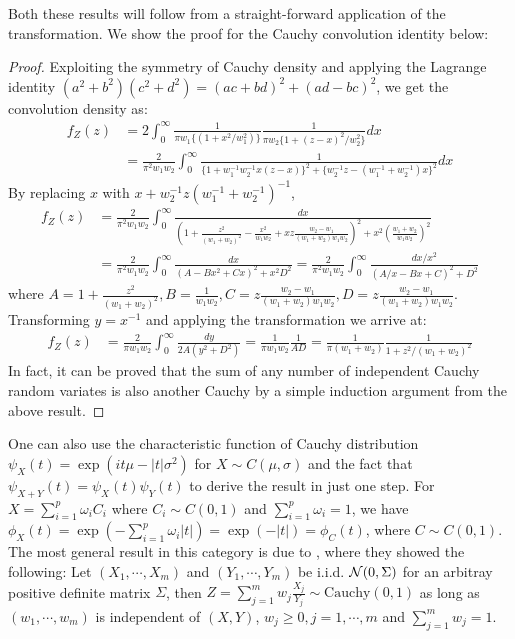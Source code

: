 \documentclass[letterpaper,11pt]{article}
\begin{document}
\noindent Both these results will follow from a straight-forward application of the \CS transformation. We show the proof for the Cauchy convolution identity below:
\begin{proof}
Exploiting the symmetry of Cauchy density and applying the Lagrange identity $(a^2 + b^2)(c^2 + d^2) = (ac+bd)^2 + (ad-bc)^2$, we get the convolution density as: 
\begin{align*} 
f_Z(z) & = 2 \int_{0}^{\infty} \frac{1}{ \pi w_1 \{ (1+ x^2/w_1^2) \} } \frac{1}{\pi w_2 \{1+ (z-x)^2/w_2^2 \} } dx \\
& = \frac{2}{\pi^2 w_1 w_2} \int_{0}^{\infty} \frac{1}{ \{1+ w_1^{-1} w_2^{-1} x (z-x) \}^2 + \{w_2^{-1}z - (w_1^{-1}+ w_2^{-1}) x \}^2 } dx
\end{align*}
By replacing $x$ with $x + w_2^{-1}z (w_1^{-1} + w_2^{-1})^{-1}$, 
\begin{align*}
f_Z(z) & = \frac{2}{\pi^2 w_1 w_2} \int_{0}^{\infty} \frac{dx}{ \left( 1 + \frac{z^2}{(w_1+w_2)^2} - \frac{x^2}{w_1w_2} + xz \frac{w_2-w_1}{(w_1+w_2) w_1 w_2} \right)^2 + x^2 (\frac{w_1 + w_2}{w_1w_2})^2} \\
& = \frac{2}{\pi^2 w_1 w_2} \int_{0}^{\infty} \frac{dx}{ \left( A - B x^2 + Cx \right)^2 + x^2 D^2 } = \frac{2}{\pi^2 w_1 w_2} \int_{0}^{\infty} \frac{dx/x^2}{ \left( A/x - B x + C \right)^2 + D^2 } 
\end{align*}
where $A = 1 + \frac{z^2}{(w_1+w_2)^2}, B = \frac{1}{w_1w_2}, C = z \frac{w_2-w_1}{(w_1+w_2) w_1 w_2}, D = z \frac{w_2-w_1}{(w_1+w_2) w_1 w_2}$. Transforming $y = x^{-1}$ and applying the \CS transformation we arrive at: 
\begin{align*}
f_Z(z) & = \frac{2}{\pi w_1 w_2} \int_{0}^{\infty} \frac{dy}{2A (y^2 + D^2)} = \frac{1}{\pi w_1 w_2} \frac{1}{A D} = \frac{1}{\pi (w_1+w_2)} \frac{1}{1+ z^2/(w_1+w_2)^2}
\end{align*}
In fact, it can be proved that the sum of any number of independent Cauchy random variates is also another Cauchy by a simple induction argument from the above result. 
\end{proof}
One can also use the characteristic function of Cauchy distribution $\psi_X(t) = \exp(it \mu - |t| \sigma^2)$ for $X \sim C(\mu, \sigma)$ and the fact that $\psi_{X+Y}(t) = \psi_X(t) \psi_Y(t)$ to derive the result in just one step. For $X = \sum_{i=1}^{p} \omega_i C_i$ where $C_i \sim C(0,1)$ and $\sum_{i=1}^{p}\omega_i = 1$, we have $\phi_X(t) = \exp(-\sum_{i=1}^{p}\omega_i |t|) = \exp(-|t|) = \phi_C(t)$, where $C \sim C(0,1)$. The most general result in this category is due to \cite{pillai2015unexpected}, where they showed the following: Let $(X_1,\cdots,X_m)$ and $(Y_1, \cdots,Y_m)$ be i.i.d. ${\cal N}(0,\Sigma)$ for an arbitray positive definite matrix $\Sigma$, then $Z = \sum_{j=1}^{m} w_j \frac{X_j}{Y_j} \sim \mathrm{Cauchy}(0,1)$ as long as $(w_1,\cdots,w_m)$ is independent of $(X,Y)$, $w_j \geq 0, j = 1, \cdots,m$ and $\sum_{j=1}^{m} w_j = 1$. 
\end{document}
